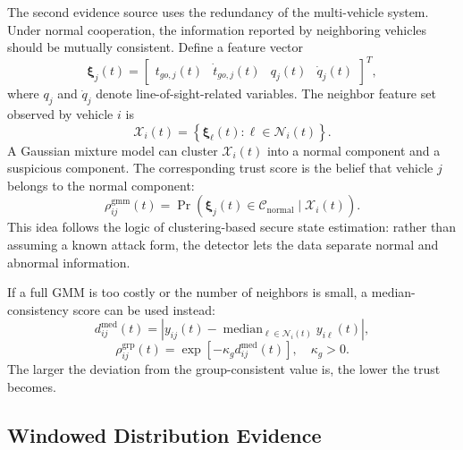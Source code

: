 \documentclass[lettersize,journal]{IEEEtran}
\begin{document}
The second evidence source uses the redundancy of the multi-vehicle system. Under normal cooperation, the information reported by neighboring vehicles should be mutually consistent. Define a feature vector
\begin{equation}
    \bm{\xi}_j(t)
    =
    \begin{bmatrix}
    t_{go,j}(t) &
    \dot t_{go,j}(t) &
    q_j(t) &
    \dot q_j(t)
    \end{bmatrix}^{T},
    \label{eq:feature_vector}
\end{equation}
where $q_j$ and $\dot q_j$ denote line-of-sight-related variables. The neighbor feature set observed by vehicle $i$ is
\begin{equation}
    \mathcal{X}_i(t)=
    \left\{
    \bm{\xi}_{\ell}(t):\ell\in\mathcal{N}_i(t)
    \right\}.
    \label{eq:gmm_dataset}
\end{equation}
A Gaussian mixture model can cluster $\mathcal{X}_i(t)$ into a normal component and a suspicious component. The corresponding trust score is the belief that vehicle $j$ belongs to the normal component:
\begin{equation}
    \rho_{ij}^{\mathrm{gmm}}(t)
    =
    \Pr\left(
    \bm{\xi}_j(t)\in\mathcal{C}_{\mathrm{normal}}
    \mid
    \mathcal{X}_i(t)
    \right).
    \label{eq:gmm_trust}
\end{equation}
This idea follows the logic of clustering-based secure state estimation: rather than assuming a known attack form, the detector lets the data separate normal and abnormal information.

If a full GMM is too costly or the number of neighbors is small, a median-consistency score can be used instead:
\begin{equation}
    d_{ij}^{\mathrm{med}}(t)
    =
    \left|
    y_{ij}(t)
    -
    \operatorname{median}_{\ell\in\mathcal{N}_i(t)}
    y_{i\ell}(t)
    \right|,
    \label{eq:median_distance}
\end{equation}
\begin{equation}
    \rho_{ij}^{\mathrm{grp}}(t)
    =
    \exp\left[-\kappa_g d_{ij}^{\mathrm{med}}(t)\right],
    \quad \kappa_g>0.
    \label{eq:group_trust}
\end{equation}
The larger the deviation from the group-consistent value is, the lower the trust becomes.

\subsection{Windowed Distribution Evidence}
\end{document}
